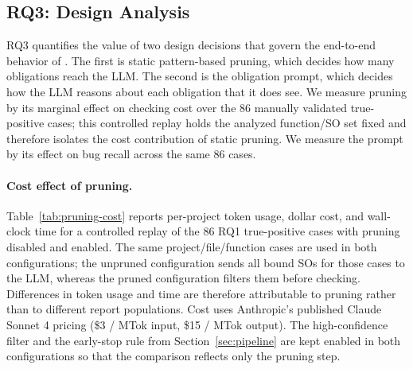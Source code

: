 \subsection{RQ3: Design Analysis}

RQ3 quantifies the value of two design decisions that govern the
end-to-end behavior of \tool. The first is static pattern-based
pruning, which decides how many obligations reach the LLM. The second
is the obligation prompt, which decides how the LLM reasons about each
obligation that it does see. We measure pruning by its marginal effect
on checking cost over the 86 manually validated true-positive cases;
this controlled replay holds the analyzed function/SO set fixed and
therefore isolates the cost contribution of static pruning. We measure
the prompt by its effect on bug recall across the same 86 cases.

\paragraph{Cost effect of pruning.}
Table~\ref{tab:pruning-cost} reports per-project token usage, dollar
cost, and wall-clock time for a controlled replay of the 86 RQ1
true-positive cases with pruning disabled and enabled. The same
project/file/function cases are used in both configurations; the
unpruned configuration sends all bound SOs for those cases to the LLM,
whereas the pruned configuration filters them before checking.
Differences in token usage and time are therefore attributable to
pruning rather than to different report populations. Cost uses
Anthropic's published Claude Sonnet 4 pricing
(\$3 / MTok input, \$15 / MTok output). The high-confidence filter and
the early-stop rule from Section~\ref{sec:pipeline} are kept enabled
in both configurations so that the comparison reflects only the
pruning step.

